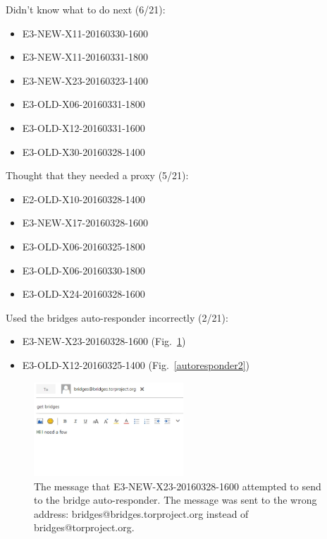 \documentclass[USenglish,oneside,twocolumn]{article}
\begin{document}
Didn't know what to do next (6/21): 
\begin{itemize}
\item E3-NEW-X11-20160330-1600
\item E3-NEW-X11-20160331-1800
\item E3-NEW-X23-20160323-1400
\item E3-OLD-X06-20160331-1800
\item E3-OLD-X12-20160331-1600
\item E3-OLD-X30-20160328-1400
\end{itemize} 

Thought that they needed a proxy (5/21): 
\begin{itemize}
\item E2-OLD-X10-20160328-1400
\item E3-NEW-X17-20160328-1600
\item E3-OLD-X06-20160325-1800
\item E3-OLD-X06-20160330-1800
\item E3-OLD-X24-20160328-1600
\end{itemize} 

Used the bridges auto-responder incorrectly (2/21): 
\begin{itemize}
\item E3-NEW-X23-20160328-1600 (Fig.~\ref{autoresponder1})
\item E3-OLD-X12-20160325-1400 (Fig.~\ref{autoresponder2})
\end{itemize}   

\begin{figure}[h]
\includegraphics[width=0.5\textwidth]{../experiment/processing/failed-participants/20160325-140813-bridgeresponder-redacted.png}
\caption{The message that E3-NEW-X23-20160328-1600 attempted to send to the bridge auto-responder. The message was sent to the wrong address: bridges@bridges.torproject.org instead of bridges@torproject.org.}
\label{autoresponder1}
\end{figure} 
\end{document}
